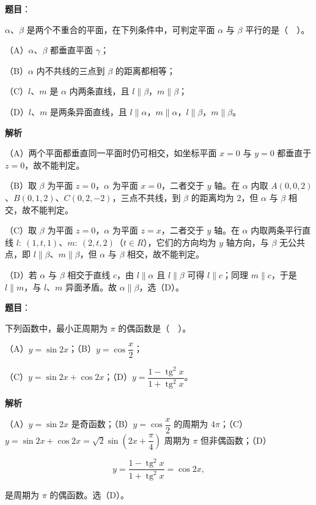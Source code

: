\begin{answer}

\textbf{题目}：

$\alpha$、$\beta$ 是两个不重合的平面，在下列条件中，可判定平面 $\alpha$ 与 $\beta$ 平行的是（　）。

（A）$\alpha$、$\beta$ 都垂直平面 $\gamma$；

（B）$\alpha$ 内不共线的三点到 $\beta$ 的距离都相等；

（C）$l$、$m$ 是 $\alpha$ 内两条直线，且 $l\parallel\beta$，$m\parallel\beta$；

（D）$l$、$m$ 是两条异面直线，且 $l\parallel\alpha$，$m\parallel\alpha$，$l\parallel\beta$，$m\parallel\beta$。

\textbf{解析}

（A）两个平面都垂直同一平面时仍可相交，如坐标平面 $x=0$ 与 $y=0$ 都垂直于 $z=0$，故不能判定。

（B）取 $\beta$ 为平面 $z=0$，$\alpha$ 为平面 $x=0$，二者交于 $y$ 轴。在 $\alpha$ 内取 $A(0,0,2)$、$B(0,1,2)$、$C(0,2,-2)$，三点不共线，到 $\beta$ 的距离均为 $2$，但 $\alpha$ 与 $\beta$ 相交，故不能判定。

（C）取 $\beta$ 为平面 $z=0$，$\alpha$ 为平面 $z=x$，二者交于 $y$ 轴。在 $\alpha$ 内取两条平行直线 $l:\ (1,t,1)$、$m:\ (2,t,2)$（$t\in R$），它们的方向均为 $y$ 轴方向，与 $\beta$ 无公共点，即 $l\parallel\beta$、$m\parallel\beta$，但 $\alpha$ 与 $\beta$ 相交，故不能判定。

（D）若 $\alpha$ 与 $\beta$ 相交于直线 $c$，由 $l\parallel\alpha$ 且 $l\parallel\beta$ 可得 $l\parallel c$；同理 $m\parallel c$，于是 $l\parallel m$，与 $l$、$m$ 异面矛盾。故 $\alpha\parallel\beta$，选（D）。


\end{answer}
\begin{answer}

\textbf{题目}：

下列函数中，最小正周期为 $\pi$ 的偶函数是（　）。

（A）$y=\sin 2x$；（B）$y=\cos\dfrac{x}{2}$；

（C）$y=\sin 2x+\cos 2x$；（D）$y=\dfrac{1-\operatorname{tg}^{2}x}{1+\operatorname{tg}^{2}x}$。

\textbf{解析}

（A）$y=\sin 2x$ 是奇函数；（B）$y=\cos\dfrac{x}{2}$ 的周期为 $4\pi$；（C）$y=\sin 2x+\cos 2x=\sqrt{2}\sin\left(2x+\dfrac{\pi}{4}\right)$ 周期为 $\pi$ 但非偶函数；（D）

\nopagebreak[4]
\[
y=\frac{1-\operatorname{tg}^{2}x}{1+\operatorname{tg}^{2}x}=\cos 2x,
\]

是周期为 $\pi$ 的偶函数。选（D）。


\end{answer}
